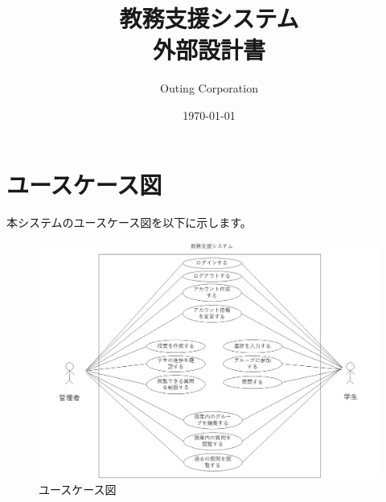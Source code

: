 \documentclass[12pt,a4j]{jarticle}
\title{\Huge 教務支援システム\\外部設計書}
\date{\today}
\author{\large Outing Corporation}
\begin{document}
\maketitle

\newpage

\setcounter{tocdepth}{2}
\tableofcontents

\newpage

\newpage



\newpage

\newpage

\newpage



\newpage

\appendix

\section{ユースケース図}
本システムのユースケース図を以下に示します。
\begin{figure}[htbp]
  \begin{center}
    \includegraphics[width=1\linewidth,clip]{./img/usecase.jpg}
    \caption{ユースケース図}\label{fig:usecase}
  \end{center}
\end{figure}
\end{document}
